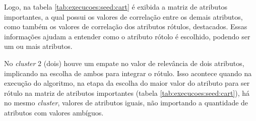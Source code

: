 Logo, na tabela \ref{tab:execucoes:seed:cart} é exibida a matriz de atributos importantes, a qual possui os valores de correlação entre os demais atributos, como também os valores de correlação dos atributos rótulos, destacados. Essas informações ajudam a entender como o atributo rótolo é escolhido, podendo ser um ou mais atributos. 
\begin{table}[!h]
\centering
\caption{Matriz de Atributos Importantes do algoritmo CART na base Seeds}
\label{tab:execucoes:seed:cart}
\end{table}   

No \textit{cluster} 2 (dois) houve um empate no valor de relevância de dois atributos, implicando na escolha de ambos para integrar o rótulo. Isso acontece quando na execução do algoritmo, na etapa da escolha do maior valor do atributo para ser rótulo na matriz de atributos importantes (tabela \ref{tab:execucoes:seed:cart}), há no mesmo \textit{cluster}, valores de atributos iguais, não importando a quantidade de atributos com valores ambíguos. 
 
